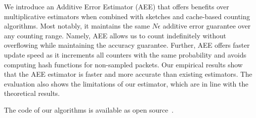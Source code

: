 We introduce an Additive Error Estimator (AEE) that offers benefits over multiplicative estimators when combined with sketches and cache-based counting algorithms. Most notably, it maintains the same $N\epsilon$ additive error guarantee over any counting range.  Namely, AEE allows us to count indefinitely without overflowing while maintaining the accuracy guarantee.  
Further, AEE offers faster update speed as it increments all counters with the same probability and avoids computing hash functions for non-sampled packets. 
%
Our empirical results show that the AEE estimator is faster and more accurate than existing estimators.  
The evaluation also shows the limitations of our estimator, which are in line with the theoretical results.   

The code of our algorithms is available as open source~\cite{opensource}.
\vspace*{-1mm}

